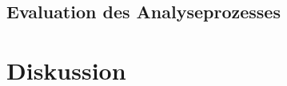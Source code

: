\documentclass[12pt,a4paper]{article}
\begin{document}
%



\subsection{Evaluation des Analyseprozesses}

\section{Diskussion}
\end{document}
